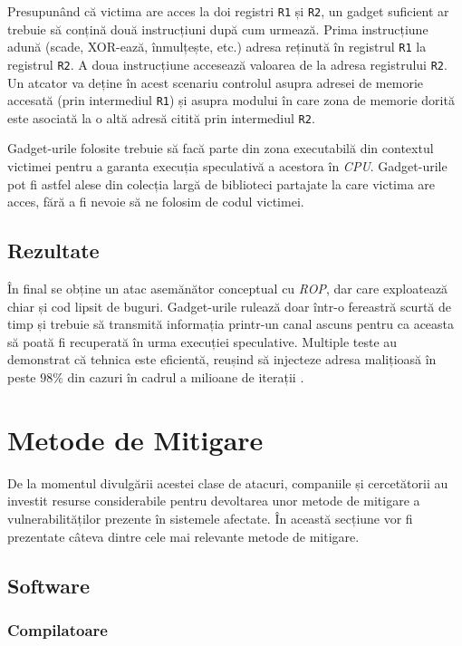 Presupunând că victima are acces la doi registri \texttt{R1} și \texttt{R2}, un
gadget suficient ar trebuie să conțină două instrucțiuni după cum urmează.
Prima instrucțiune adună (scade, XOR-ează, înmulțește, etc.) adresa reținută în
registrul \texttt{R1} la registrul \texttt{R2}. A doua instrucțiune accesează
valoarea de la adresa registrului \texttt{R2}. Un atcator va deține în acest
scenariu controlul asupra adresei de memorie accesată (prin intermediul
\texttt{R1}) și asupra modului în care zona de memorie dorită este asociată
la o altă adresă citită prin intermediul \texttt{R2}.

Gadget-urile folosite trebuie să facă parte din zona executabilă din contextul
victimei pentru a garanta execuția speculativă a acestora în \emph{CPU}. 
Gadget-urile pot fi astfel alese din colecția largă de biblioteci partajate la 
care victima are acces, fără a fi nevoie să ne folosim de codul victimei.

\subsection{Rezultate}

În final se obține un atac asemănător conceptual cu \emph{ROP}, dar care exploatează
chiar și cod lipsit de buguri. Gadget-urile rulează doar într-o fereastră 
scurtă de timp și trebuie să transmită informația printr-un canal ascuns pentru
ca aceasta să poată fi recuperată în urma execuției speculative. Multiple teste
au demonstrat că tehnica este eficientă, reușind să injecteze adresa malițioasă în
peste $98\%$ din cazuri în cadrul a milioane de iterații \cite{spectre2019}.

\section{Metode de Mitigare}

De la momentul divulgării acestei clase de atacuri, companiile și cercetătorii
au investit resurse considerabile pentru devoltarea unor metode de mitigare a
vulnerabilităților prezente în sistemele afectate. În această secțiune vor
fi prezentate câteva dintre cele mai relevante metode de mitigare.

\subsection{Software}

\subsubsection{Compilatoare}

